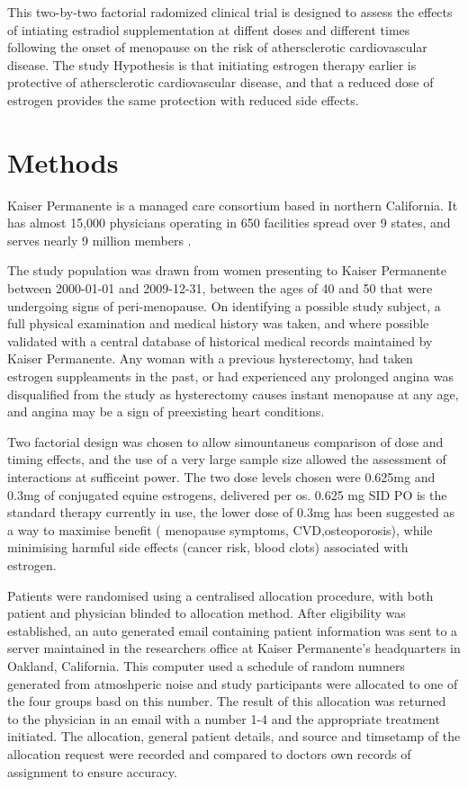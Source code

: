 \documentclass[12pt]{article}
\begin{document}
		This two-by-two factorial radomized clinical trial is designed to assess the effects of intiating estradiol supplementation at diffent doses and different times following the onset of menopause on the risk of athersclerotic cardiovascular disease.
		The study Hypothesis is that initiating estrogen therapy earlier is protective of athersclerotic cardiovascular disease, and that a reduced dose of estrogen provides the same protection with reduced side effects.


	\section{Methods} 
		Kaiser Permanente is a managed care consortium based in northern California. It has almost 15,000 physicians operating in 650 facilities spread over 9 states, and serves nearly 9 million members \cite{Rauber}.

		The study population was drawn from women presenting to Kaiser Permanente between 2000-01-01 and 2009-12-31, between the ages of 40 and 50 that were undergoing signs of peri-menopause.
		On identifying a possible study subject, a full physical examination and medical history was taken, and where possible validated with a central database of historical medical records maintained by Kaiser Permanente.
		Any woman with a previous hysterectomy, had taken estrogen suppleaments in the past, or had experienced any prolonged angina was disqualified from the study as hysterectomy causes instant menopause at any age, and angina may be a sign of preexisting heart conditions.


		Two factorial design was chosen to allow simountaneus comparison of dose and timing effects, and the use of a very large sample size allowed the assessment of interactions at sufficeint power. 
		The two dose levels chosen were 0.625mg and 0.3mg of conjugated equine estrogens, delivered per os.
		0.625 mg SID PO is the standard therapy currently in use, the lower dose of 0.3mg has been suggested as a way to maximise benefit ( menopause symptoms, CVD,osteoporosis), while minimising harmful side effects (cancer risk, blood clots)  associated with estrogen.

		


		Patients were randomised using a centralised allocation procedure, with both patient and physician blinded to allocation method. 
		After eligibility was established, an auto generated email containing patient information was sent to a server maintained in the researchers office at Kaiser Permanente's headquarters in Oakland, California. 
		This computer used a schedule of random numners generated from atmoshperic noise \cite{Eddelbuettel2009}  and study participants were allocated to one of the four groups basd on this number.
		The result of this allocation was returned to the physician in an email with a number 1-4 and the appropriate treatment initiated.
		The allocation, general patient details, and source and timsetamp of the allocation request were recorded and compared to doctors own records of assignment to ensure accuracy.
\end{document}
